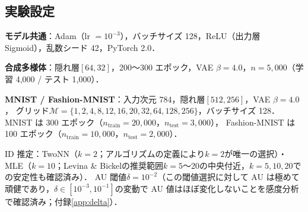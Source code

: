 \documentclass[11pt,a4paper]{jsarticle}
\begin{document}
\subsection{実験設定}\label{sec:exp_setup}

\textbf{モデル共通}：Adam（lr $= 10^{-3}$），バッチサイズ 128，ReLU（出力層 Sigmoid），乱数シード 42，PyTorch 2.0．

\textbf{合成多様体}：隠れ層$[64, 32]$，200〜300 エポック，VAE $\beta = 4.0$，$n = 5{,}000$（学習 4,000 / テスト 1,000）．

\textbf{MNIST / Fashion-MNIST}：入力次元 784，隠れ層$[512, 256]$，VAE $\beta = 4.0$，
グリッド$\mathcal{M} = \{1,2,4,8,12,16,20,32,64,128,256\}$，バッチサイズ 128．
MNIST は 300 エポック（$n_{\mathrm{train}} = 20{,}000$，$n_{\mathrm{test}} = 3{,}000$），
Fashion-MNIST は 100 エポック（$n_{\mathrm{train}} = 10{,}000$，$n_{\mathrm{test}} = 2{,}000$）．

ID 推定：TwoNN（$k=2$；アルゴリズムの定義により$k=2$が唯一の選択）・MLE（$k=10$；Levina \& Bickel\cite{levina2005mle}の推奨範囲$k=5$〜20の中央付近，$k=5,10,20$での安定性も確認済み）\cite{facco2017twonn,levina2005mle}．
AU 閾値$\delta = 10^{-2}$\cite{lucas2019elbo}（この閾値選択に対して AU は極めて頑健であり，$\delta \in [10^{-3}, 10^{-1}]$の変動で AU 値はほぼ変化しないことを感度分析で確認済み；付録\ref{app:delta}）．
\end{document}
